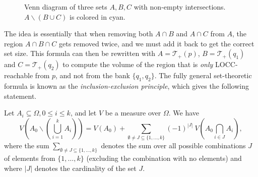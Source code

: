 \begin{figure}[h!] %
    \centering
    \caption{Venn diagram of three sets $A, B, C$ with non-empty intersections. $A \backslash (B \cup C)$ is colored in cyan.}
    \label{fig:venn_three}
\end{figure}

The idea is essentially that when removing both $A \cap B$ and $A \cap C$ from $A$, the region $A \cap B \cap C$ gets removed twice, and we must add it back to get the correct set size. This formula can then be rewritten with $A = \mathcal{T}_+(p)$, $B = \mathcal{T}_+(q_1)$ and $C = \mathcal{T}_+(q_2)$ to compute the volume of the region that is \textit{only} LOCC-reachable from $p$, and not from the bank $\{q_1, q_2\}$. The fully general set-theoretic formula is known as the \textit{inclusion-exclusion principle}, which gives the following statement.

\begin{theorem} \label{th:inclusion-exclusion}
    Let $A_i \subseteq \Omega, 0 \leq i \leq k$, and let $V$ be a measure over $\Omega$. We have
    \begin{equation}
        V\left(A_0 \backslash \left(\bigcup\limits_{i = 1}^k A_i\right)\right) = V(A_0) + \sum_{\emptyset \neq J \subseteq \{1, \dots, k\}} (-1)^{|J|} \: V\left(A_0 \bigcap\limits_{i \in J} A_i\right),
    \end{equation}
    where the sum $\sum_{\emptyset \neq J \subseteq \{1, \dots, k\}}$ denotes the sum over all possible combinations $J$ of elements from $\{1, \dots, k\}$ (excluding the combination with no elements) and where $|J|$ denotes the cardinality of the set $J$.
\end{theorem}

